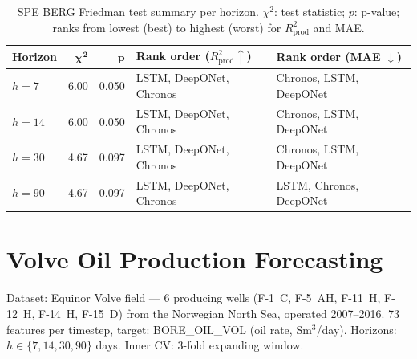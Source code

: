 \documentclass[11pt]{article}
\newcommand{\rp}{R^2_\text{prod}}
\begin{document}
\begin{table}[ht]
\centering
\caption{SPE BERG Friedman test summary per horizon.
$\chi^2$: test statistic; $p$: p-value; ranks from lowest (best) to highest (worst) for $\rp$ and MAE.}
\label{tab:spe_berg_friedman}
\small
\setlength{\tabcolsep}{3pt}
\begin{tabular}{@{}l rr l l@{}}
\toprule
\textbf{Horizon} & $\boldsymbol{\chi^2}$ & $\boldsymbol{p}$ & \textbf{Rank order ($\rp \uparrow$)} & \textbf{Rank order (MAE $\downarrow$)} \\
\midrule
$h{=}7$    & 6.00 & 0.050 & LSTM, DeepONet, Chronos & Chronos, LSTM, DeepONet \\
$h{=}14$   & 6.00 & 0.050 & LSTM, DeepONet, Chronos & Chronos, LSTM, DeepONet \\
$h{=}30$   & 4.67 & 0.097 & LSTM, DeepONet, Chronos & Chronos, LSTM, DeepONet \\
$h{=}90$   & 4.67 & 0.097 & LSTM, DeepONet, Chronos & LSTM, Chronos, DeepONet \\
\bottomrule
\end{tabular}
\end{table}

\newpage
\section{Volve Oil Production Forecasting}

Dataset: Equinor Volve field — 6 producing wells (F-1~C, F-5~AH, F-11~H, F-12~H, F-14~H, F-15~D)
from the Norwegian North Sea, operated 2007--2016.
73 features per timestep, target: BORE\_OIL\_VOL (oil rate, Sm$^3$/day).
Horizons: $h \in \{7, 14, 30, 90\}$ days.
Inner CV: 3-fold expanding window.
\end{document}
